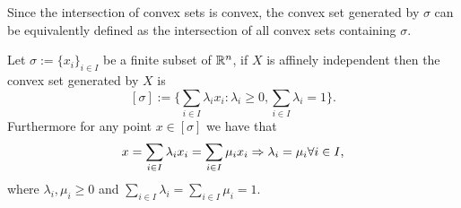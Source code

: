 \documentclass[../1.tex]{subfiles}
\begin{document}
    Since the intersection of convex sets is convex, the convex set generated by $\sigma$ can be equivalently defined as the intersection 
    of all convex sets containing $\sigma$.

    \begin{thm}
        Let $\sigma := \{x_i\}_{i \in I}$ be a finite subset of $\mathbb{R}^n$, if $X$ is affinely independent then the convex set generated by $X$ is 
        \[ [\sigma] := \{ \sum_{i \in I} \lambda_i x_i : \lambda_i \geq 0, \sum_{i \in I} \lambda_i = 1\}. \]
        Furthermore for any point $x \in [\sigma]$ we have that
        \[ x = \sum_{i \in I} \lambda_i x_i = \sum_{i \in I} \mu_i x_i \Rightarrow \lambda_i = \mu_i \forall i \in I, \] 
        where $\lambda_i,\mu_i \geq 0$ and $\sum_{i \in I} \lambda_i = \sum_{i \in I} \mu_i =1$.
        \label{thm:1}
    \end{thm}
\end{document}
